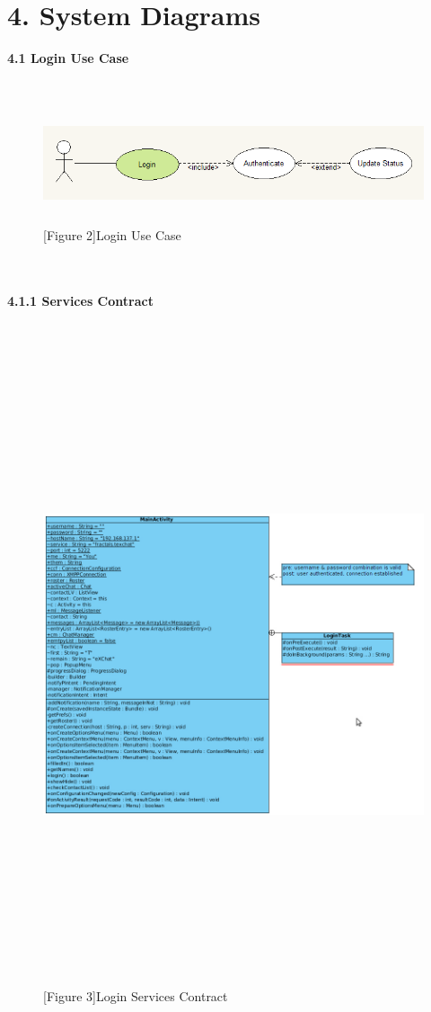 \documentclass[29pt,a4paper]{moderncv}
\begin{document}
	\section*{\textbf{4. System Diagrams}}
	\vspace{2mm}
	 \left\textbf{4.1 Login Use Case}\\
		\\ \begin{figure}
			\centering
			\\ \includegraphics[width=5.8in, height=1.1in]{./loginCase.png}
			\\\caption{[Figure 2]Login Use Case}
		\end{figure}\\
	\newpage
		\\ \noindent\left\textbf{4.1.1 Services Contract}\\
		\\ \begin{figure}
							\centering
							\\ \includegraphics[width=6.6in, height=7.1in]{./1_LoginSC.jpg}
							\\\caption{[Figure 3]Login Services Contract}
						\end{figure}\\
		
\end{document}
